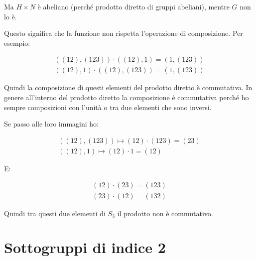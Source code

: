 \begin{soluzione}
	Ma $H \times N$ è abeliano (perché prodotto diretto di gruppi abeliani), mentre $G$ non lo è.
	
	Questo significa che la funzione non rispetta l'operazione di composizione.
	Per esempio:
	
	\begin{gather}
		((12), (123)) \cdot ((12), 1) = (1, (123)) \\
		((12), 1) \cdot ((12), (123)) = (1, (123))
	\end{gather}

	Quindi la composizione di questi elementi del prodotto diretto è commutativa.
	In genere all'interno del prodotto diretto la composizione è commutativa perché ho sempre composizioni con l'unità
	o tra due elementi che sono inversi.
	
	Se passo alle loro immagini ho:
	
	\begin{gather}
		((12), (123)) \longmapsto (12) \cdot (123) = (23) \\
		((12), 1) \longmapsto (12) \cdot 1 = (12)
	\end{gather}

	E:
	
	\begin{gather}
		(12) \cdot (23) = (123) \\
		(23) \cdot (12) = (132)
	\end{gather}

	Quindi tra questi due elementi di $S_3$ il prodotto non è commutativo.
	
\end{soluzione}

\section{Sottogruppi di indice 2}

